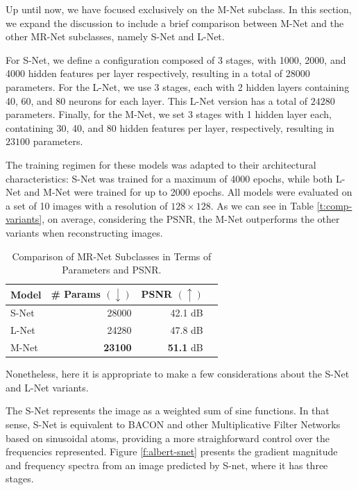 Up until now, we have focused exclusively on the M-Net subclass. In this section, we expand the discussion to include a brief comparison between M-Net and the other MR-Net subclasses, namely S-Net and L-Net.

For S-Net, we define a configuration composed of 3 stages, with 1000, 2000, and 4000 hidden features per layer respectively, resulting in a total of $28000$ parameters. For the L-Net, we use 3 stages, each with 2 hidden layers containing 40, 60, and 80 neurons for each layer. This L-Net version has a total of $24280$ parameters. Finally, for the M-Net, we set 3 stages with 1 hidden layer each, contatining 30, 40, and 80 hidden features per layer, respectively, resulting in $23100$ parameters. 

The training regimen for these models was adapted to their architectural characteristics: S-Net was trained for a maximum of 4000 epochs, while both L-Net and M-Net were trained for up to 2000 epochs. All models were evaluated on a set of 10 images with a resolution of $128 \times 128$. As we can see in Table \ref{t:comp-variants}, on average, considering the PSNR, the M-Net outperforms the other variants when reconstructing images.

\begin{table}[!h]
\centering
\small
\begin{tabular}{|l|r|r|r|}
\hline
Model & \# Params $(\downarrow)$ & PSNR $(\uparrow)$  \\
\hline
S-Net & 28000 & 42.1 dB  \\
L-Net & 24280 & 47.8 dB \\
M-Net & {\bf 23100} & {\bf 51.1} dB   \\
\hline
\end{tabular}
\caption{\label{tab:comp-variants} Comparison of MR-Net Subclasses in Terms of Parameters and PSNR.}
\label{t:comp_variantes}
\end{table}

Nonetheless, here it is appropriate to make a few considerations about the S-Net and L-Net variants.

The S-Net represents the image as a weighted sum of sine functions. In that sense, S-Net is equivalent to BACON and other Multiplicative Filter Networks based on sinusoidal atoms, providing a more straighforward control over the frequencies represented. Figure \ref{f:albert-snet} presents the gradient magnitude and frequency spectra from an image predicted by S-net, where it has three stages.


